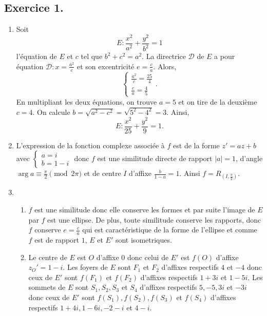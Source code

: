 \documentclass[a4paper]{article}
\begin{document}
\subsection*{Exercice 1.}
\begin{enumerate}
	\item Soit \[
			E:\frac{x^2}{a^2}+\frac{y^2}{b^2}=1
	\] 
	l'équation de $E$ et $c$ tel que $b^2+c^2=a^2$. La directrice $\mathcal{D}$ de $E$ a pour équation  $\mathcal{D}:x=\frac{a^2}{c}$ et son excentricité $e=\frac{c}{a}$. Alors,
	\[
		\begin{cases}
			\frac{a^2}{c}=\frac{25}{4}\\
			\frac{c}{a}=\frac{4}{5}
		\end{cases}
	.\] 
	En multipliant les deux équations, on trouve $a=5$ et on tire de la deuxième $c=4$. On calcule $b=\sqrt{a^2-c^2}=\sqrt{5^2-4^2}=3$. Ainsi,
	\[
	E:\frac{x^2}{25}+\frac{y^2}{9}=1
	.\] 
\item L'expression de la fonction complexe associée à $f$ est de la forme $z'=az+b$ avec $\begin{cases}a=i\\b=1-i\end{cases}$ donc $f$ est une similitude directe de rapport $|a|=1$, d'angle $\arg a\equiv\frac{\pi}{2}\pmod{2\pi}$ et de centre $I$ d'affixe $\frac{b}{1-a}=1$. Ainsi $f=R_{(I,\frac{\pi}{2})}$.
\item	\begin{enumerate}
\item $f$ est une similitude donc elle conserve les formes et par suite l'image de  $E$ par $f$ est une ellipse. De plus, toute similitude conserve les rapports, donc $f$ conserve $e=\frac{c}{a}$ qui est caractéristique de la forme de l'ellipse et comme $f$ est de rapport $1$, $E$ et $E'$ sont isometriques.
\item Le centre de $E$ est $O$ d'affixe $0$ donc celui de $E'$ est $f(O)$ d'affixe $z_O'=1-i$. Les foyers de $E$ sont $F_1$ et $F_2$ d'affixes respectifs $4$ et $-4$ donc ceux de $E'$ sont $f(F_1)$ et $f(F_2)$ d'affixes respectifs $1+3i$ et $1-5i$.	Les sommets de $E$ sont $S_1,S_2,S_3$ et $S_4$ d'affixes respectifs $5,-5,3i$ et $-3i$ donc ceux de $E'$ sont $f(S_1),f(S_2),f(S_3)$ et $f(S_4)$ d'affixes respectifs $1+4i,1-6i,-2-i$ et $4-i$.
	\end{enumerate}
\end{enumerate}
\end{document}
